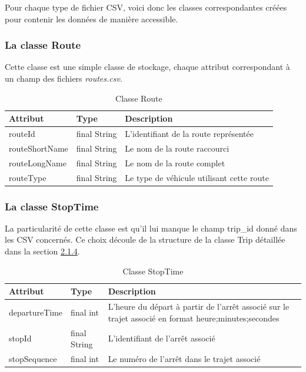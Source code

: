 \documentclass[12pt]{article}
\begin{document}
Pour chaque type de fichier CSV, voici donc les classes correspondantes créées pour contenir les données de manière accessible.

\subsubsection{La classe Route}
\label{sec:route}
Cette classe est une simple classe de stockage, chaque attribut correspondant à un champ des fichiers \emph{routes.csv}.

\begin{table}[h]
    \centering
    \begin{tabular}{|l|l|p{8cm}|}
    \hline
    \textbf{Attribut} & \textbf{Type} & \textbf{Description} \\
    \hline
    routeId & final String & L'identifiant de la route représentée \\
    routeShortName & final String & Le nom de la route raccourci \\
    routeLongName & final String & Le nom de la route complet \\
    routeType & final String & Le type de véhicule utilisant cette route \\
    \hline
    \end{tabular}
    \caption{Classe Route}
\end{table}

\subsubsection{La classe StopTime}
\label{sec:stoptime}
La particularité de cette classe est qu'il lui manque le champ trip\_id donné dans les CSV concernés. Ce choix découle
de la structure de la classe Trip détaillée dans la section \hyperref[sec:trip]{2.1.4}.
\begin{table}[h]
    \centering
    \begin{tabular}{|l|l|p{8cm}|}
    \hline
    \textbf{Attribut} & \textbf{Type} & \textbf{Description} \\
    \hline
    departureTime & final int & L'heure du départ à partir de
                                   l'arrêt associé sur le trajet associé en format 
                                   heure;minutes;secondes \\
    stopId & final String & L'identifiant de l'arrêt associé \\
    stopSequence & final int & Le numéro de l'arrêt dans le trajet associé \\
    \hline
    \end{tabular}
    \caption{Classe StopTime}
\end{table}
\end{document}
